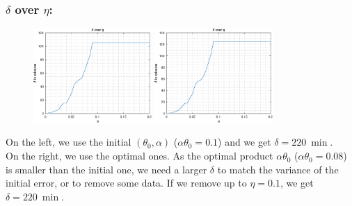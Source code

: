 \documentclass[aspectratio=169]{beamer}\usepackage[utf8]{inputenc}
\begin{document}
\begin{frame}\frametitle{$\delta$ over $\eta$:}

\begin{figure}[ht!]
\centering
\includegraphics[width=0.4\textwidth]{../../MATLAB_Files/Results/delta/eta_min_ini.eps}\quad\quad
\includegraphics[width=0.4\textwidth]{../../MATLAB_Files/Results/delta/eta_min_opt.eps}
\end{figure}
On the left, we use the initial $(\theta_0,\alpha)$ ($\alpha\theta_0=0.1$) and we get $\delta=\SI{220}{\min}$.\\
On the right, we use the optimal ones. As the optimal product $\alpha\theta_0$ ($\alpha\theta_0=0.08$) is smaller than the initial one, we need a larger $\delta$ to match the variance of the initial error, or to remove some data. If we remove up to $\eta=0.1$, we get $\delta=\SI{220}{\min}$.
\end{frame}
\end{document}
